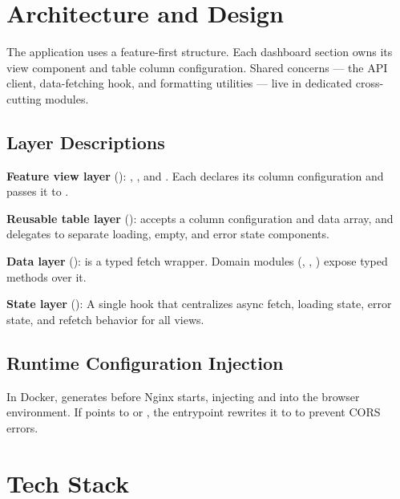 \section{Architecture and Design}

The application uses a feature-first structure. Each dashboard section owns its view component and table column configuration. Shared concerns — the API client, data-fetching hook, and formatting utilities — live in dedicated cross-cutting modules.

\subsection{Layer Descriptions}

\textbf{Feature view layer} (): , , and . Each declares its column configuration and passes it to .

\textbf{Reusable table layer} ():  accepts a column configuration and data array, and delegates to separate loading, empty, and error state components.

\textbf{Data layer} ():  is a typed fetch wrapper. Domain modules (, , ) expose typed methods over it.

\textbf{State layer} (): A single hook that centralizes async fetch, loading state, error state, and refetch behavior for all views.

\subsection{Runtime Configuration Injection}

In Docker,  generates  before Nginx starts, injecting  and  into the browser environment. If  points to  or , the entrypoint rewrites it to  to prevent CORS errors.

\section{Tech Stack}

